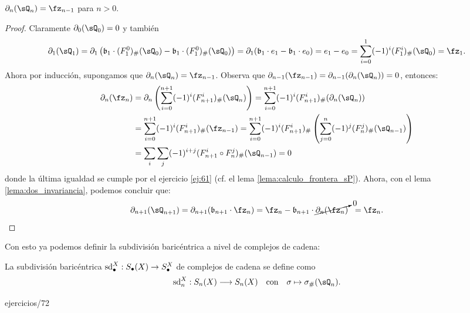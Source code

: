 \documentclass[../../topologia_algebraica]{subfiles}
\begin{document}
\begin{lema}\label{lema:calculo_frontera_sQ}
  $\partial_n(\sQ_n)=\fz_{n-1}$ para $n>0$.
\end{lema}
\begin{proof}
  Claramente $\partial_0(\sQ_0)=0$ y tambi\'en
  \[
    \partial_1(\sQ_1)=\partial_1\paren{\fb_1\cdot (F^0_1)_{\#}(\sQ_0)-\fb_1\cdot(F^0_1)_{\#}(\sQ_0)}=
    \partial_1(\fb_1\cdot e_1 -\fb_1\cdot e_0)=e_1-e_0=\sum_{i=0}^1(-1)^i(F^i_1)_{\#}(\sQ_0)=\fz_1.
  \]
  Ahora por inducci\'on, supongamos que $\partial_n(\sQ_n)=\fz_{n-1}$. Observa que
  $\partial_{n-1}(\fz_{n-1})=\partial_{n-1}(\partial_n(\sQ_n))=0$, entonces:
  \begin{align*}
  \partial_n(\fz_n) & =\partial_n\paren{\sum_{i=0}^{n+1}(-1)^i(F^i_{n+1})_{\#}(\sQ_{n})}=
  \sum_{i=0}^{n+1}(-1)^i(F^i_{n+1})_{\#}(\partial_n(\sQ_{n}))\\ & =
  \sum_{i=0}^{n+1}(-1)^i(F^i_{n+1})_{\#}(\fz_{n-1})=
  \sum_{i=0}^{n+1}(-1)^i(F^i_{n+1})_{\#}\paren{\sum_{j=0}^n(-1)^j(F^j_n)_{\#}(\sQ_{n-1})} \\ & =
  \sum_i \sum_j (-1)^{i+j}(F^i_{n+1}\circ F^j_n)_{\#}(\sQ_{n-1})=0
  \end{align*}
  donde la \'ultima igualdad se cumple por el ejercicio \ref{ej:61} (cf. el lema
  \ref{lema:calculo_frontera_sP}). Ahora, con el lema \ref{lema:dos_invariancia}, podemos
  concluir que:
  \[
    \partial_{n+1}(\sQ_{n+1})=
    \partial_{n+1}(\fb_{n+1}\cdot\fz_n)=
    \fz_n-\fb_{n+1}\cdot\cancelto{0}{\partial_n(\fz_n)}\;\;=
    \fz_n.
  \]
  
\end{proof}

Con esto ya podemos definir la subdivisi\'on baric\'entrica a nivel de complejos de
cadena:

\begin{defin}
  La subdivisi\'on baric\'entrica $\text{sd}_{\bullet}^X:S_{\bullet}(X)\rightarrow S_{\bullet}^X$ de
  complejos de cadena se define como
  \[
    \text{sd}^X_n:S_n(X)\lra S_n(X) \quad\text{con}\quad \sigma\mapsto \sigma_{\#}(\sQ_n).
  \]
\end{defin}

{ejercicios/72} %
\end{document}
